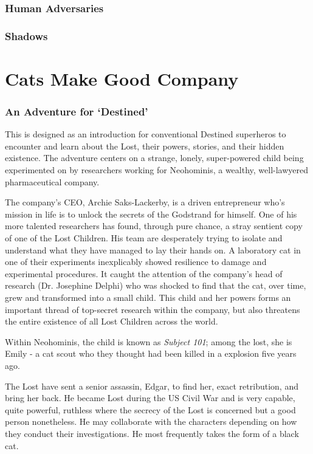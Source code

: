 \documentclass[letterpaper,serif]{rpg-module}
\begin{document}
\section{Human Adversaries}
\label{npcs}

\section{Shadows}
\label{npcs}

\pagebreak

\part{Cats Make Good Company}
\label{cmgc}

\section{An Adventure for `Destined'} 
\label{scenario ideas}

This is designed as an introduction for conventional Destined superheros to encounter and learn about the Lost, their powers, stories, and their hidden existence. The adventure centers on a strange, lonely, super-powered child being experimented on by researchers working for Neohominis, a wealthy, well-lawyered pharmaceutical company. 

The company's CEO, Archie Saks-Lackerby, is a driven entrepreneur who's mission in life is to unlock the secrets of the Godstrand for himself. One of his more talented researchers has found, through pure chance, a stray sentient copy of one of the Lost Children. His team are  desperately trying to isolate and understand what they have managed to lay their hands on. A laboratory cat in one of their experiments inexplicably showed resilience to damage and experimental procedures. It caught the attention of the company's head of research (Dr. Josephine Delphi) who was shocked to find that the cat, over time, grew and transformed into a small child. This child and her powers forms an important thread of top-secret research within the company, but also threatens the entire existence of all Lost Children across the world. 

Within Neohominis, the child is known as \emph{Subject 101}; among the lost, she is Emily - a cat scout who they thought had been killed in a explosion five years ago. 

The Lost have sent a senior assassin, Edgar, to find her, exact retribution, and bring her back. He became Lost during the US Civil War and is very capable, quite powerful, ruthless where the secrecy of the Lost is concerned but a good person nonetheless. He may collaborate with the characters depending on how they conduct their investigations. He most frequently takes the form of a black cat.
\end{document}
